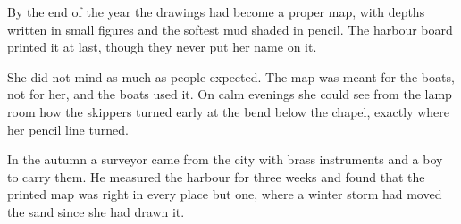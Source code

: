 \documentclass[11pt,twoside,openright]{book}
\begin{document}
By the end of the year the drawings had become a proper map, with depths written in small figures and the softest mud shaded in pencil. The harbour board printed it at last, though they never put her name on it.

She did not mind as much as people expected. The map was meant for the boats, not for her, and the boats used it. On calm evenings she could see from the lamp room how the skippers turned early at the bend below the chapel, exactly where her pencil line turned.

In the autumn a surveyor came from the city with brass instruments and a boy to carry them. He measured the harbour for three weeks and found that the printed map was right in every place but one, where a winter storm had moved the sand since she had drawn it.
\end{document}
